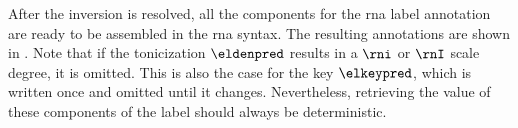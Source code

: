 
After the inversion is resolved, all the components for the
\gls{rna} label annotation are ready to be assembled in the
\gls{rna} syntax. The resulting annotations are shown in
. Note that if the
tonicization $\eldenpred$ results in a $\rni$ or $\rnI$
scale degree, it is omitted. This is also the case for the
key $\elkeypred$, which is written once and omitted until it
changes. Nevertheless, retrieving the value of these
components of the label should always be deterministic.

